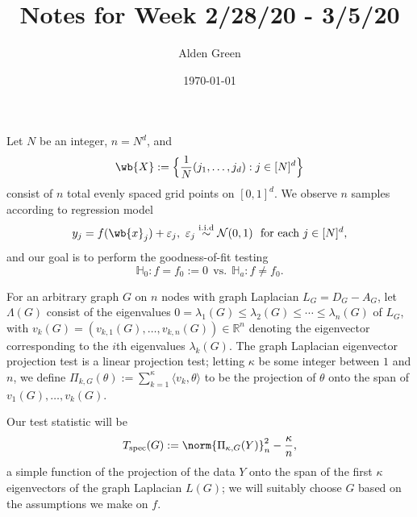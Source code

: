 \documentclass{article}
\newcommand{\Reals}{\mathbb{R}}
\newcommand{\1}{\mathbf{1}}
\newcommand{\dotp}[2]{\langle #1, #2 \rangle}
\theoremstyle{alden}
\theoremstyle{aldenthm}
\theoremstyle{definition}
\theoremstyle{remark}
\begin{document}
\title{Notes for Week 2/28/20 - 3/5/20}
\author{Alden Green}
\date{\today}
\maketitle

Let $N$ be an integer, $n = N^d$, and 
\begin{equation*}
\wb{X} := \Bigl\{\frac{1}{N}(j_1,\ldots,j_d): j \in [N]^d\Bigr\}
\end{equation*}
consist of $n$ total evenly spaced grid points on $[0,1]^d$. We observe $n$ samples according to regression model
\begin{equation}
\label{eqn:grid_regression_model}
y_j = f(\wb{x}_j) + \varepsilon_j, ~\varepsilon_j \overset{\mathrm{i.i.d}}{\sim} \mathcal{N}(0,1) ~~\textrm{for each $j \in [N]^d$,}
\end{equation}
and our goal is to perform the goodness-of-fit testing
\begin{equation*}
\mathbb{H}_0 : f = f_0 := 0 ~~\textrm{vs.}~~ \mathbb{H}_a: f \neq f_0.
\end{equation*}

For an arbitrary graph $G$ on $n$ nodes with graph Laplacian $L_G = D_G - A_G$, let $\Lambda(G)$ consist of the eigenvalues $0 = \lambda_1(G) \leq \lambda_2(G) \leq \cdots \leq \lambda_n(G)$ of $L_G$, with $v_k(G) = (v_{k,1}(G),\ldots,v_{k,n}(G)) \in \Reals^n$ denoting the eigenvector corresponding to the $i$th eigenvalues $\lambda_k(G)$. The graph Laplacian eigenvector projection test is a linear projection test; letting $\kappa$ be some integer between $1$ and $n$, we define $\Pi_{k,G}(\theta) := \sum_{k = 1}^{\kappa} \dotp{v_k}{\theta}$ to be the projection of $\theta$ onto the span of $v_1(G),\ldots,v_k(G)$. 

Our test statistic will be
\begin{equation*}
T_{\mathrm{spec}}(G) := \norm{\Pi_{\kappa,G}(Y)}_n^2 - \frac{\kappa}{n},
\end{equation*}
a simple function of the projection of the data $Y$ onto the span of the first $\kappa$ eigenvectors of the graph Laplacian $L(G)$; we will suitably choose $G$ based on the assumptions we make on $f$.
\end{document}
